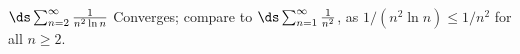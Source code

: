 {$\ds \sum_{n=2}^\infty \frac{1}{n^2\ln n}$
}
{Converges; compare to $\ds \sum_{n=1}^\infty \frac 1{n^2}$, as $1/(n^2\ln n) \leq 1/n^2$ for all $n\geq 2$.
}